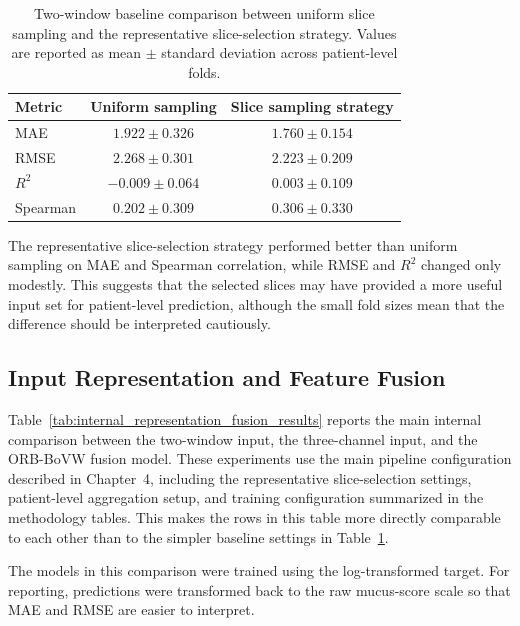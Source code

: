 \begin{table}[H]
\centering
\caption{Two-window baseline comparison between uniform slice sampling and the representative slice-selection strategy. Values are reported as mean \(\pm\) standard deviation across patient-level folds.}
\label{tab:baseline_results}
\small
\begin{tabular}{lcc}
\toprule
Metric & Uniform sampling & Slice sampling strategy \\
\midrule
MAE & \(1.922 \pm 0.326\) & \(1.760 \pm 0.154\) \\
RMSE & \(2.268 \pm 0.301\) & \(2.223 \pm 0.209\) \\
\(R^2\) & \(-0.009 \pm 0.064\) & \(0.003 \pm 0.109\) \\
Spearman & \(0.202 \pm 0.309\) & \(0.306 \pm 0.330\) \\
\bottomrule
\end{tabular}
\end{table}

The representative slice-selection strategy performed better than uniform sampling on MAE and Spearman correlation, while RMSE and \(R^2\) changed only modestly. This suggests that the selected slices may have provided a more useful input set for patient-level prediction, although the small fold sizes mean that the difference should be interpreted cautiously.


\subsection{Input Representation and Feature Fusion}
\label{sec:input_representation_feature_fusion_results}

Table~\ref{tab:internal_representation_fusion_results} reports the main internal comparison between the two-window input, the three-channel input, and the ORB-BoVW fusion model. These experiments use the main pipeline configuration described in Chapter~4, including the representative slice-selection settings, patient-level aggregation setup, and training configuration summarized in the methodology tables. This makes the rows in this table more directly comparable to each other than to the simpler baseline settings in Table~\ref{tab:baseline_results}.

The models in this comparison were trained using the log-transformed target. For reporting, predictions were transformed back to the raw mucus-score scale so that MAE and RMSE are easier to interpret.

